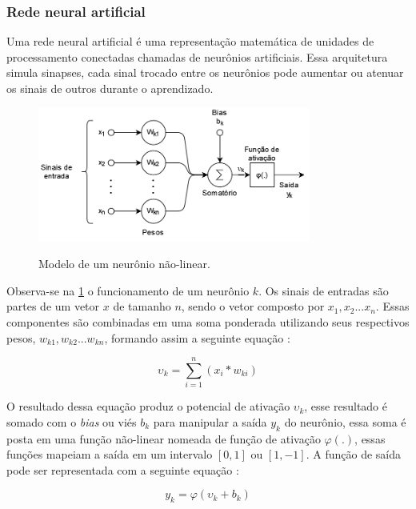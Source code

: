 \subsubsection{Rede neural artificial}

Uma rede neural artificial é uma representação matemática de unidades de processamento conectadas chamadas de neurônios artificiais. Essa arquitetura simula sinapses, cada sinal trocado entre os neurônios pode aumentar ou atenuar os sinais de outros durante o aprendizado\cite{ml_and_dp}.
\begin{figure}[ht]
	\centering
	\caption{Modelo de um neurônio não-linear.}
	\includegraphics[width=0.8\textwidth]{figures/neuronio.png}
	\label{fig:neuronio}
\end{figure}

Observa-se na \cref{fig:neuronio} o funcionamento de um neurônio $k$. Os sinais de entradas são partes de um vetor $x$ de tamanho $n$, sendo o vetor composto por $x_1, x_2 ... x_n$. Essas componentes são combinadas em uma soma ponderada utilizando seus respectivos pesos, $w_{k1}, w_{k2}...w_{kn}$, formando assim a seguinte equação  :

\begin{equation}
	\upsilon_k = \sum_{i=1}^n (x_i * w_{ki})
\end{equation}

O resultado dessa equação produz o potencial de ativação $\upsilon_k$, esse resultado é somado com o \textit{bias} ou viés $b_k$ para manipular a saída $y_k$ do neurônio, essa soma é posta em uma função não-linear nomeada de função de ativação $\varphi(.)$, essas funções mapeiam a saída em um intervalo $[0, 1]$ ou $[1, -1]$. A função de saída pode ser representada com a seguinte equação :

\begin{equation}
	y_k = \varphi(\upsilon_k + b_k)
\end{equation}

